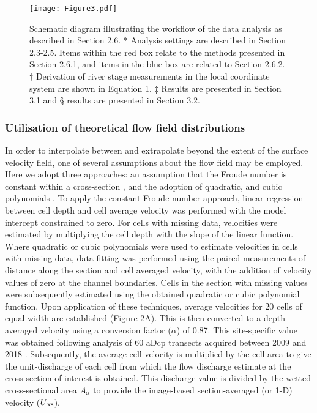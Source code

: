 \documentclass[hess, manuscript]{copernicus} %
\begin{document}
\begin{figure}[!htb]
\centering 
\texttt{[image: Figure3.pdf]}
\caption{Schematic diagram illustrating the workflow of the data analysis as described in Section 2.6. * Analysis settings are described in Section 2.3-2.5. Items within the red box relate to the methods presented in Section 2.6.1, and items in the blue box are related to Section 2.6.2. † Derivation of river stage measurements in the local coordinate system are shown in Equation 1. ‡ Results are presented in Section 3.1 and § results are presented in Section 3.2.}
\label{Figure3} 
\end{figure}

\FloatBarrier

\subsubsection{Utilisation of theoretical flow field distributions} 
\label{Data-driven fitting}

In order to interpolate between and extrapolate beyond the extent of the surface velocity field, one of several assumptions about the flow field may be employed. Here we adopt three approaches: an assumption that the Froude number is constant within a cross-section \citep{LeCoz2010, Fulford1986}, and the adoption of quadratic, and cubic polynomials \citep{Leitao2018}. To apply the constant Froude number approach, linear regression between cell depth and cell average velocity was performed with the model intercept constrained to zero. For cells with missing data, velocities were estimated by multiplying the cell depth with the slope of the linear function. Where quadratic or cubic polynomials were used to estimate velocities in cells with missing data, data fitting was performed using the paired measurements of distance along the section and cell averaged velocity, with the addition of velocity values of zero at the channel boundaries. Cells in the section with missing values were subsequently estimated using the obtained quadratic or cubic polynomial function. Upon application of these techniques, average velocities for 20 cells of equal width are established (Figure 2A). This is then converted to a depth-averaged velocity using a conversion factor ($\alpha$) of 0.87. This site-specific value was obtained following analysis of 60 aDcp transects acquired between 2009 and 2018 \citep{alpha_analysis}. Subsequently, the average cell velocity is multiplied by the cell area to give the unit-discharge of each cell from which the flow discharge estimate at the cross-section of interest is obtained. This discharge value is divided by the wetted cross-sectional area {$A\textsubscript{s}$} to provide the image-based section-averaged (or 1-D) velocity (${U}\textsubscript{xs}$).
\end{document}
